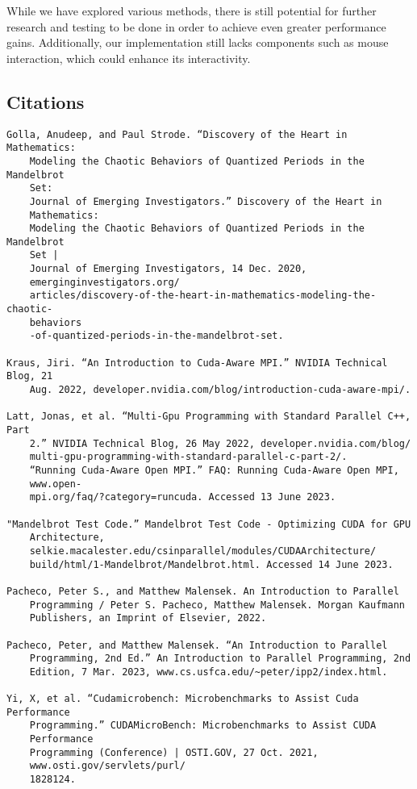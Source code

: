 \documentclass{article}
\begin{document}
While we have explored various methods, there is still potential for 
further research and testing to be done in order to achieve even greater 
performance gains.
Additionally, our implementation still lacks components such as mouse 
interaction, which could enhance its interactivity.

\pagebreak

\begin{center}

\section*{Citations}

\end{center}

\begin{verbatim}
Golla, Anudeep, and Paul Strode. “Discovery of the Heart in Mathematics: 
    Modeling the Chaotic Behaviors of Quantized Periods in the Mandelbrot
    Set: 
    Journal of Emerging Investigators.” Discovery of the Heart in 
    Mathematics:
    Modeling the Chaotic Behaviors of Quantized Periods in the Mandelbrot
    Set | 
    Journal of Emerging Investigators, 14 Dec. 2020, 
    emerginginvestigators.org/
    articles/discovery-of-the-heart-in-mathematics-modeling-the-chaotic-
    behaviors
    -of-quantized-periods-in-the-mandelbrot-set. 
    
Kraus, Jiri. “An Introduction to Cuda-Aware MPI.” NVIDIA Technical Blog, 21 
    Aug. 2022, developer.nvidia.com/blog/introduction-cuda-aware-mpi/. 
    
Latt, Jonas, et al. “Multi-Gpu Programming with Standard Parallel C++, Part 
    2.” NVIDIA Technical Blog, 26 May 2022, developer.nvidia.com/blog/
    multi-gpu-programming-with-standard-parallel-c-part-2/. 
    “Running Cuda-Aware Open MPI.” FAQ: Running Cuda-Aware Open MPI, 
    www.open-
    mpi.org/faq/?category=runcuda. Accessed 13 June 2023. 

"Mandelbrot Test Code.” Mandelbrot Test Code - Optimizing CUDA for GPU 
    Architecture, 
    selkie.macalester.edu/csinparallel/modules/CUDAArchitecture/
    build/html/1-Mandelbrot/Mandelbrot.html. Accessed 14 June 2023. 

Pacheco, Peter S., and Matthew Malensek. An Introduction to Parallel 
    Programming / Peter S. Pacheco, Matthew Malensek. Morgan Kaufmann 
    Publishers, an Imprint of Elsevier, 2022. 

Pacheco, Peter, and Matthew Malensek. “An Introduction to Parallel  
    Programming, 2nd Ed.” An Introduction to Parallel Programming, 2nd 
    Edition, 7 Mar. 2023, www.cs.usfca.edu/~peter/ipp2/index.html. 

Yi, X, et al. “Cudamicrobench: Microbenchmarks to Assist Cuda Performance
    Programming.” CUDAMicroBench: Microbenchmarks to Assist CUDA 
    Performance 
    Programming (Conference) | OSTI.GOV, 27 Oct. 2021, 
    www.osti.gov/servlets/purl/
    1828124. 
\end{verbatim}
\end{document}
